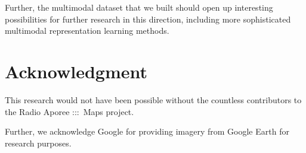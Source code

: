 \documentclass[journal]{IEEEtran}
\begin{document}
Further, the multimodal dataset that we built should open up interesting
possibilities for further research in this direction,
including more sophisticated multimodal representation learning methods.

\section*{Acknowledgment}
This research would not have been possible without the
countless contributors to the Radio Aporee :::~Maps project.

Further, we acknowledge Google for providing imagery from Google Earth for research purposes.







\end{document}

